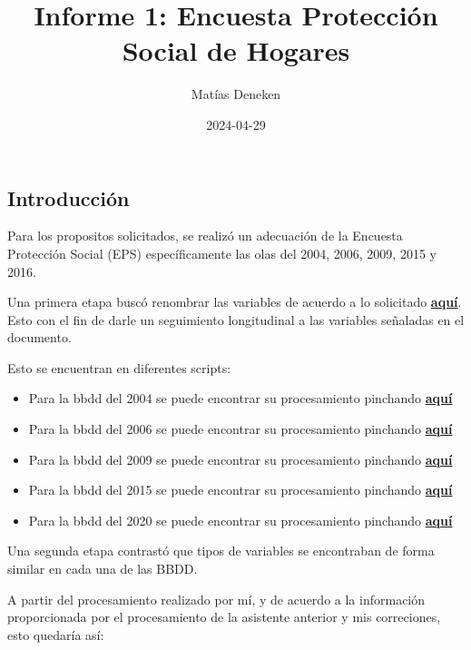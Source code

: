 \documentclass[
]{article}
\title{Informe 1: Encuesta Protección Social de Hogares}
\author{Matías Deneken}
\date{2024-04-29}
\begin{document}
\maketitle

\hypertarget{introducciuxf3n}{%
\subsection{Introducción}\label{introducciuxf3n}}

Para los propositos solicitados, se realizó un adecuación de la Encuesta
Protección Social (EPS) específicamente las olas del 2004, 2006, 2009,
2015 y 2016.

Una primera etapa buscó renombrar las variables de acuerdo a lo
solicitado
\href{https://www.dropbox.com/scl/fi/lujwecrqvs6pza08093ul/Rename-variables.docx?rlkey=mdn8s825i83jrltojfyp7tddf\&dl=0}{\textbf{aquí}}.
Esto con el fin de darle un seguimiento longitudinal a las variables
señaladas en el documento.

Esto se encuentran en diferentes scripts:

\begin{itemize}
\item
  Para la bbdd del 2004 se puede encontrar su procesamiento pinchando
  \href{https://github.com/matdknu/EPS/blob/main/process/base2004.R}{\textbf{aquí}}
\item
  Para la bbdd del 2006 se puede encontrar su procesamiento pinchando
  \href{https://github.com/matdknu/EPS/blob/main/process/base2006.R}{\textbf{aquí}}
\item
  Para la bbdd del 2009 se puede encontrar su procesamiento pinchando
  \href{https://github.com/matdknu/EPS/blob/main/process/base2009.R}{\textbf{aquí}}
\item
  Para la bbdd del 2015 se puede encontrar su procesamiento pinchando
  \href{https://github.com/matdknu/EPS/blob/main/process/base2015.R}{\textbf{aquí}}
\item
  Para la bbdd del 2020 se puede encontrar su procesamiento pinchando
  \href{https://github.com/matdknu/EPS/blob/main/process/base2020.R}{\textbf{aquí}}
\end{itemize}

Una segunda etapa contrastó que tipos de variables se encontraban de
forma similar en cada una de las BBDD.

A partir del procesamiento realizado por mí, y de acuerdo a la
información proporcionada por el procesamiento de la asistente anterior
y mis correciones, esto quedaría así:
\end{document}
